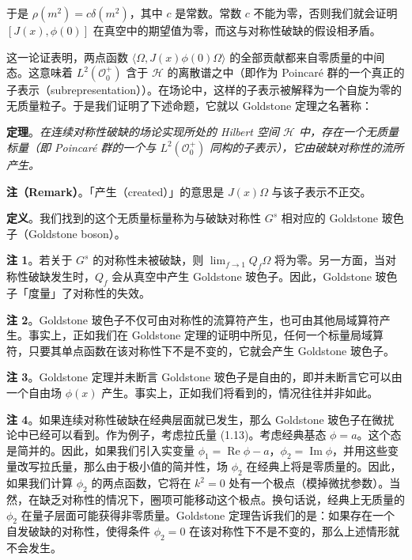 
于是 $\rho(m^2)=c\delta(m^2)$，其中 $c$ 是常数。常数 $c$ 不能为零，否则我们就会证明 $[J(x),\phi(0)]$ 在真空中的期望值为零，而这与对称性破缺的假设相矛盾。

这一论证表明，两点函数 $\langle\Omega,J(x)\phi(0)\Omega\rangle$ 的全部贡献都来自零质量的中间态。这意味着 $L^2(\mathcal{O}_0^+)$ 含于 $\mathcal{H}$ 的离散谱之中（即作为 Poincaré 群的一个真正的子表示（subrepresentation））。在场论中，这样的子表示被解释为一个自旋为零的无质量粒子。于是我们证明了下述命题，它就以 Goldstone 定理之名著称：

\noindent\textbf{定理}。\emph{在连续对称性破缺的场论实现所处的 Hilbert 空间 $\mathcal{H}$ 中，存在一个无质量标量（即 Poincaré 群的一个与 $L^2(\mathcal{O}_0^+)$ 同构的子表示），它由破缺对称性的流所产生。}

\noindent\textbf{注（Remark）}。「产生（created）」的意思是 $J(x)\Omega$ 与该子表示不正交。

\noindent\textbf{定义}。我们找到的这个无质量标量称为与破缺对称性 $G^s$ 相对应的 Goldstone 玻色子（Goldstone boson）。

\noindent\textbf{注 1}。若关于 $G^s$ 的对称性未被破缺，则 $\lim_{f\to1}Q_f\Omega$ 将为零。另一方面，当对称性破缺发生时，$Q_f$ 会从真空中产生 Goldstone 玻色子。因此，Goldstone 玻色子「度量」了对称性的失效。

\noindent\textbf{注 2}。Goldstone 玻色子不仅可由对称性的流算符产生，也可由其他局域算符产生。事实上，正如我们在 Goldstone 定理的证明中所见，任何一个标量局域算符，只要其单点函数在该对称性下不是不变的，它就会产生 Goldstone 玻色子。

\noindent\textbf{注 3}。Goldstone 定理并未断言 Goldstone 玻色子是自由的，即并未断言它可以由一个自由场 $\phi(x)$ 产生。事实上，正如我们将看到的，情况往往并非如此。

\noindent\textbf{注 4}。如果连续对称性破缺在经典层面就已发生，那么 Goldstone 玻色子在微扰论中已经可以看到。作为例子，考虑拉氏量 (1.13)。考虑经典基态 $\phi=a$。这个态是简并的。因此，如果我们引入实变量 $\phi_1=\operatorname{Re}\phi-a$，$\phi_2=\operatorname{Im}\phi$，并用这些变量改写拉氏量，那么由于极小值的简并性，场 $\phi_2$ 在经典上将是零质量的。因此，如果我们计算 $\phi_2$ 的两点函数，它将在 $k^2=0$ 处有一个极点（模掉微扰参数）。当然，在缺乏对称性的情况下，圈项可能移动这个极点。换句话说，经典上无质量的 $\phi_2$ 在量子层面可能获得非零质量。Goldstone 定理告诉我们的是：如果存在一个自发破缺的对称性，使得条件 $\phi_2=0$ 在该对称性下不是不变的，那么上述情形就不会发生。

